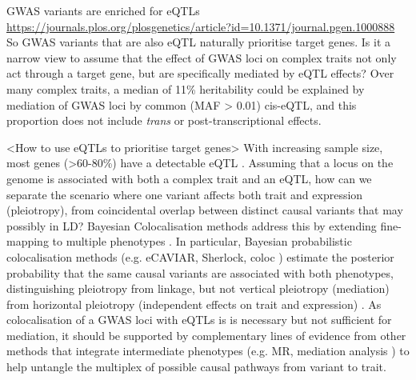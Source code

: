 \begin{outline}
\1 GWAS variants are enriched for eQTLs \url{https://journals.plos.org/plosgenetics/article?id=10.1371/journal.pgen.1000888}
    \2 So GWAS variants that are also eQTL naturally prioritise target genes.
    \2 Is it a narrow view to assume that the effect of GWAS loci on complex traits not only act through a target gene, but are specifically mediated by eQTL effects?
        \3 Over many complex traits, a median of 11\% heritability could be explained by mediation of GWAS loci by common (MAF > 0.01) cis-eQTL, 
        and this proportion does not include \textit{trans} or post-transcriptional effects.

\1 <How to use eQTLs to prioritise target genes>
\2 With increasing sample size, most genes (>60-80\%) have a detectable eQTL \autocite{vandiedonck2017GeneticAssociationMolecular,vosa2018UnravelingPolygenicArchitecture}.
Assuming that a locus on the genome is associated with both a complex trait and an \gls{eQTL},
how can we separate the scenario where one variant affects both trait and expression (pleiotropy),
from coincidental overlap between distinct causal variants that may possibly in \gls{LD}?
Bayesian Colocalisation methods address this by extending fine-mapping to multiple phenotypes \autocite{burgess2018InferringCausalRelationships}.
In particular, Bayesian probabilistic colocalisation methods (e.g. eCAVIAR, Sherlock, coloc \autocite{wallace2020ElicitingPriorsRelaxing}) 
estimate the posterior probability that the same causal variants are associated with both phenotypes,
distinguishing pleiotropy from linkage, 
but not vertical pleiotropy (mediation) from horizontal pleiotropy (independent effects on trait and expression) \autocite{hemani2018EvaluatingPotentialRole}.
As colocalisation of a \gls{GWAS} loci with \glspl{eQTL} is is necessary but not sufficient for mediation, 
it should be supported by complementary lines of evidence from other methods that integrate intermediate phenotypes (e.g. MR, mediation analysis \autocite{hemani2018EvaluatingPotentialRole})
to help untangle the multiplex of possible causal pathways from variant to trait.
%

\end{outline}
